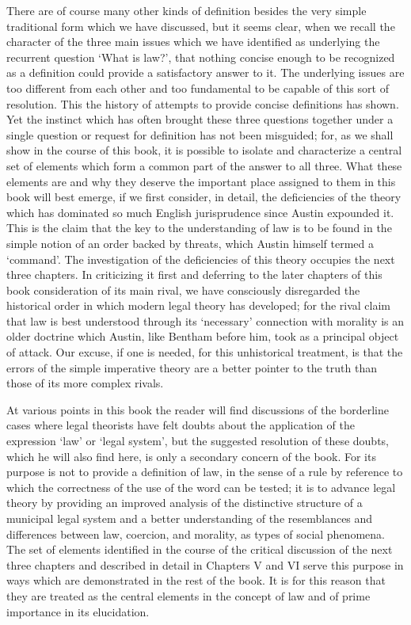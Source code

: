 \documentclass[12pt,oneside]{book}  %
\begin{document}
There are of course many other kinds of definition besides the very
simple traditional form which we have discussed, but it seems clear,
when we recall the character of the three main issues which we have
identified as underlying the recurrent question `What is law?', that
nothing concise enough to be recognized as a definition could provide a
satisfactory answer to it. The underlying issues are too different from
each other and too fundamental to be capable of this sort of resolution.
This the history of attempts to provide concise definitions has shown.
Yet the instinct which has often brought these three questions together
under a single question or request for definition has not been
misguided; for, as we shall show in the course of this book, it is
possible to isolate and characterize a central set of elements which
form a common part of the answer to all three. What these elements are
and why they deserve the important place assigned to them in this book
will best emerge, if we first consider, in detail, the deficiencies of
the theory which has dominated so much English jurisprudence since
Austin expounded it. This is the claim that the key to the understanding
of law is to be found in the simple notion of an order backed by
threats, which Austin himself termed a `command'. The investigation of
the deficiencies of this theory occupies the next three chapters. In
criticizing it first and deferring to the later chapters of this book
consideration of its main rival, we have consciously disregarded the
historical order in which modern legal theory has developed; for the
rival claim that law is best understood through its `necessary'
connection with morality is an older doctrine which Austin, like Bentham
before him, took as a principal object of attack. Our excuse, if one is
needed, for this unhistorical treatment, is that the errors of the
simple imperative theory are a better pointer to the truth than those of
its more complex rivals.

At various points in this book the reader will find discussions of the
borderline cases where legal theorists have felt doubts about the
application of the expression `law' or `legal system', but the suggested
resolution of these doubts, which he will also find here, is only a
secondary concern of the book. For its purpose is not to provide a
definition of law, in the sense of a rule by reference to which the
correctness of the use of the word can be tested; it is to advance legal
theory by providing an improved analysis of the distinctive structure of
a municipal legal system and a better understanding of the resemblances
and differences between law, coercion, and morality, as types of social
phenomena. The set of elements identified in the course of the critical
discussion of the next three chapters and described in detail in
Chapters V and VI serve this purpose in ways which are demonstrated in
the rest of the book. It is for this reason that they are treated as the
central elements in the concept of law and of prime importance in its
elucidation.
\end{document}
